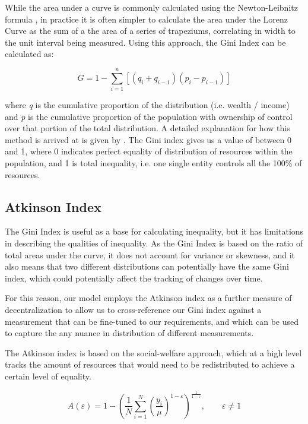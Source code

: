 \documentclass[conference]{IEEEtran}
\begin{document}
While the area under a curve is commonly calculated using the Newton-Leibnitz formula \cite{kalinski2016}, in practice it is often simpler to calculate the area under the Lorenz Curve as the sum of a the area of a series of trapeziums, correlating in width to the unit interval being measured.  Using this approach, the Gini Index can be calculated as:

\[G=1-\sum_{i=1}^{n}\left[ \left( q_{i}+q_{i-1} \right) \left( p_{i}-p_{i-1} \right) \right]\]

where \textit{q} is the cumulative proportion of the distribution (i.e. wealth / income) and \textit{p} is the cumulative proportion of the population with ownership of control over that portion of the total distribution.  A detailed explanation for how this method is arrived at is given by \cite{bellu2006inequality}.
The Gini index gives us a value of between 0 and 1, where 0 indicates perfect equality of distribution of resources within the population, and 1 is total inequality, i.e. one single entity controls all the 100\% of resources.

\subsection{Atkinson Index}

The Gini Index is useful as a base for calculating inequality, but it has limitations in describing the qualities of inequality.  As the Gini Index is based on the ratio of total areas under the curve, it does not account for variance or skewness, and it also means that two different distributions can potentially have the same Gini index, which could potentially affect the tracking of changes over time.

For this reason, our model employs the Atkinson index \cite{atkinson1970measurement} as a further measure of decentralization to allow us to cross-reference our Gini index against a measurement that can be fine-tuned to our requirements, and which can be used to capture the any nuance in distribution of different measurements.

The Atkinson index is based on the social-welfare approach, which at a high level tracks the amount of resources that would need to be redistributed to achieve a certain level of equality.

\[A(\varepsilon) = 1 - \left(\frac{1}{N} \sum_{i=1}^{N} \left(\frac{y_i}{\mu}\right)^{1 - \varepsilon}\right)^{\frac{1}{1 - \varepsilon}}, \quad \quad \varepsilon \neq 1
\]
\end{document}
